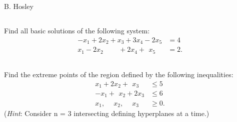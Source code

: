 \documentclass[12pt]{amsart}
\begin{document}
\hspace{\fill} {\large B. Hosley}
\bigskip

\setcounter{section}{2}
\setcounter{subsection}{23}
\subsection{}
Find all basic solutions of the following system:
\begin{align*}
	-x_1 + 2x_2  + x_3   + 3x_4 -    2x_5 &= 4 \\
	 x_1 - 2x_2 \qquad\, + 2x_4 + \,\ x_5 &= 2.
\end{align*}

\setcounter{subsection}{39}
\subsection{}
Find the extreme points of the region defined by the following
inequalities:
\begin{align*}
	  x_1 + 2x_2 + \,\ x_3 &\leq 5 \\
	- x_1 + \,\ x_2 + 2x_3 &\leq 6 \\
	  x_1, \quad\ x_2, \quad\ x_3 &\geq 0.
\end{align*}
(\textit{Hint}: Consider n = 3 intersecting defining hyperplanes at a time.)

\setcounter{section}{3}
\setcounter{subsection}{0}
\subsection{}
\end{document}
